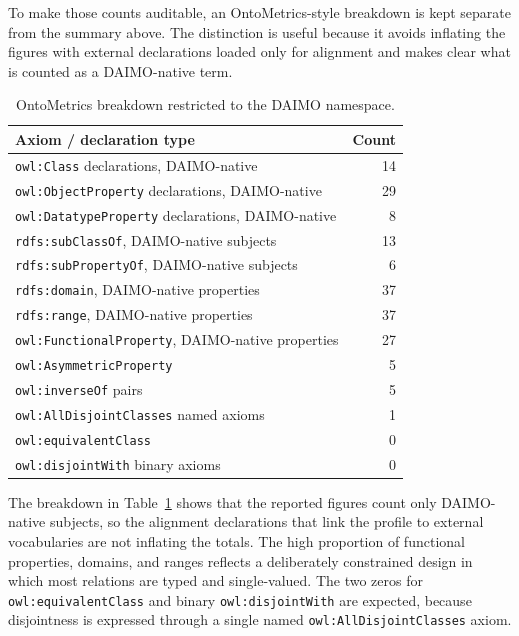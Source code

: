 \documentclass[Afour,sagev,times]{sagej}
\newcommand{\code}[1]{\texttt{#1}}
\begin{document}
To make those counts auditable, an OntoMetrics-style breakdown is kept separate from the summary above. The distinction is useful because it avoids inflating the figures with external declarations loaded only for alignment and makes clear what is counted as a DAIMO-native term.

\begin{table}[tb]
\small\sf\centering
\caption{OntoMetrics breakdown restricted to the DAIMO namespace.\label{tab:ontometrics}}
\begin{tabular}{@{}p{5.0cm}r@{}}
\toprule
\textbf{Axiom / declaration type} & \textbf{Count} \\
\midrule
\code{owl:Class} declarations, DAIMO-native & 14 \\
\code{owl:ObjectProperty} declarations, DAIMO-native & 29 \\
\code{owl:DatatypeProperty} declarations, DAIMO-native & 8 \\
\code{rdfs:subClassOf}, DAIMO-native subjects & 13 \\
\code{rdfs:subPropertyOf}, DAIMO-native subjects & 6 \\
\code{rdfs:domain}, DAIMO-native properties & 37 \\
\code{rdfs:range}, DAIMO-native properties & 37 \\
\code{owl:FunctionalProperty}, DAIMO-native properties & 27 \\
\code{owl:AsymmetricProperty} & 5 \\
\code{owl:inverseOf} pairs & 5 \\
\code{owl:AllDisjointClasses} named axioms & 1 \\
\code{owl:equivalentClass} & 0 \\
\code{owl:disjointWith} binary axioms & 0 \\
\bottomrule
\end{tabular}
\end{table}

The breakdown in Table~\ref{tab:ontometrics} shows that the reported figures count only DAIMO-native subjects, so the alignment declarations that link the profile to external vocabularies are not inflating the totals. The high proportion of functional properties, domains, and ranges reflects a deliberately constrained design in which most relations are typed and single-valued. The two zeros for \code{owl:equivalentClass} and binary \code{owl:disjointWith} are expected, because disjointness is expressed through a single named \code{owl:AllDisjointClasses} axiom.
\end{document}
